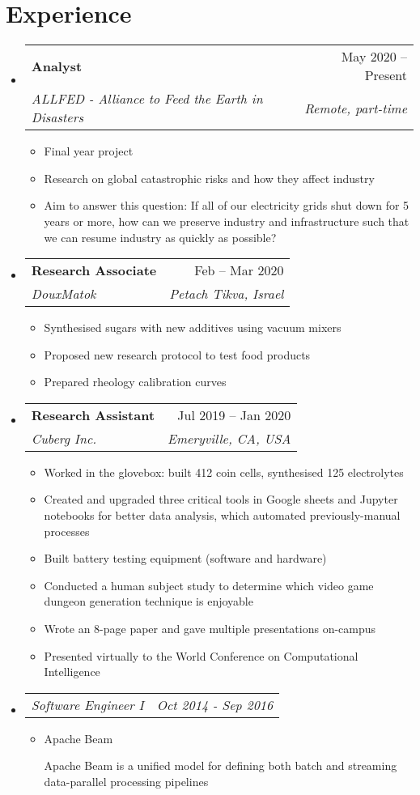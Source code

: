 \documentclass[a4paper,11pt]{article}
\makeatletter
\newcommand{\resumeItem}[1]{
  \item\small{
    {#1 \vspace{-2pt}}
  }
}
\newcommand{\resumeSubheading}[4]{
  \vspace{-2pt}\item
    \begin{tabular*}{0.97\textwidth}[t]{l@{\extracolsep{\fill}}r}
      \textbf{#1} & #2 \\
      \textit{\small#3} & \textit{\small #4} \\
    \end{tabular*}\vspace{-7pt}
}
\newcommand{\resumeSubSubheading}[2]{
    \item
    \begin{tabular*}{0.97\textwidth}{l@{\extracolsep{\fill}}r}
      \textit{\small#1} & \textit{\small #2} \\
    \end{tabular*}\vspace{-7pt}
}
\newcommand{\resumeSubHeadingListStart}{\begin{itemize}[leftmargin=0.15in, label={}]}
\newcommand{\resumeSubHeadingListEnd}{\end{itemize}}
\newcommand{\resumeItemListStart}{\begin{itemize}}
\newcommand{\resumeItemListEnd}{\end{itemize}\vspace{-5pt}}
\makeatother
\begin{document}
\section{Experience}
  \resumeSubHeadingListStart
  
    \resumeSubheading
      {Analyst}{May 2020 -- Present}
      {ALLFED - Alliance to Feed the Earth in Disasters}{Remote, part-time}
      \resumeItemListStart
        \resumeItem{Final year project}
        \resumeItem{Research on global catastrophic risks and how they affect industry}
        \resumeItem{Aim to answer this question: If all of our electricity grids shut down for 5 years or more, how can we preserve industry and infrastructure such that we can resume industry as quickly as possible?}
      \resumeItemListEnd

    \resumeSubheading
      {Research Associate}{Feb -- Mar 2020}
      {DouxMatok}{Petach Tikva, Israel}
      \resumeItemListStart
        \resumeItem{Synthesised sugars with new additives using vacuum mixers}
        \resumeItem{Proposed new research protocol to test food products}
        \resumeItem{Prepared rheology calibration curves}
      \resumeItemListEnd
      
    \resumeSubheading
      {Research Assistant}{Jul 2019 -- Jan 2020}
      {Cuberg Inc.}{Emeryville, CA, USA}
      \resumeItemListStart
        \resumeItem{Worked in the glovebox: built 412 coin cells, synthesised 125 electrolytes}
        \resumeItem{Created and upgraded three critical tools in Google sheets and Jupyter notebooks for better data analysis, which automated previously-manual processes}
        \resumeItem{Built battery testing equipment (software and hardware)}
        \resumeItem{Conducted  a human subject study to determine which video game dungeon generation technique is enjoyable}
        \resumeItem{Wrote an 8-page paper and gave multiple presentations on-campus}
        \resumeItem{Presented virtually to the World Conference on Computational Intelligence}
      \resumeItemListEnd
      
      \iffalse
    \resumeSubSubheading
     {Software Engineer I}{Oct 2014 - Sep 2016}
    \resumeItemListStart
        \resumeItem{Apache Beam}
          {Apache Beam is a unified model for defining both batch and streaming data-parallel processing pipelines}
     \resumeItemListEnd
    \resumeSubHeadingListEnd
\end{document}
